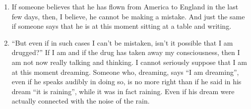 \documentclass{book}
\begin{document}
\begin{enumerate}
\item
If someone believes that he has flown from America to England in the last few
days, then, I believe, he cannot be making a mistake.  And just the same if
someone says that he is at this moment sitting at a table and writing.

\item
``But even if in such cases I can't be mistaken, isn't it possible that I am
drugged?'' If I am and if the drug has taken away my consciousness, then I am
not now really talking and thinking. I cannot seriously suppose that I am at
this moment dreaming. Someone who, dreaming, says ``I am dreaming'', even if he
speaks audibly in doing so, is no more right than if he said in his dream ``it
is raining'', while it was in fact raining. Even if his dream were actually
connected with the noise of the rain.

\end{enumerate}
\end{document}
